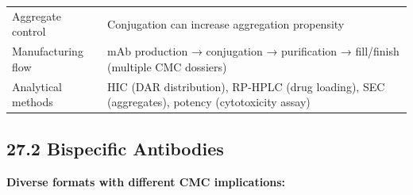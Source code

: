 \documentclass[
  11pt,
  a4paper,
]{report}
\begin{document}
\begin{longtable}[]{@{}ll@{}}
\begin{minipage}[t]{0.47\columnwidth}
Aggregate control\strut
\end{minipage} & \begin{minipage}[t]{0.47\columnwidth}\raggedright
Conjugation can increase aggregation propensity\strut
\end{minipage}\tabularnewline
\begin{minipage}[t]{0.47\columnwidth}\raggedright
Manufacturing flow\strut
\end{minipage} & \begin{minipage}[t]{0.47\columnwidth}\raggedright
mAb production → conjugation → purification → fill/finish (multiple CMC
dossiers)\strut
\end{minipage}\tabularnewline
\begin{minipage}[t]{0.47\columnwidth}\raggedright
Analytical methods\strut
\end{minipage} & \begin{minipage}[t]{0.47\columnwidth}\raggedright
HIC (DAR distribution), RP-HPLC (drug loading), SEC (aggregates),
potency (cytotoxicity assay)\strut
\end{minipage}\tabularnewline
\bottomrule
\end{longtable}

\hypertarget{bispecific-antibodies}{%
\subsection{27.2 Bispecific Antibodies}\label{bispecific-antibodies}}

\textbf{Diverse formats with different CMC implications:}
\end{document}
